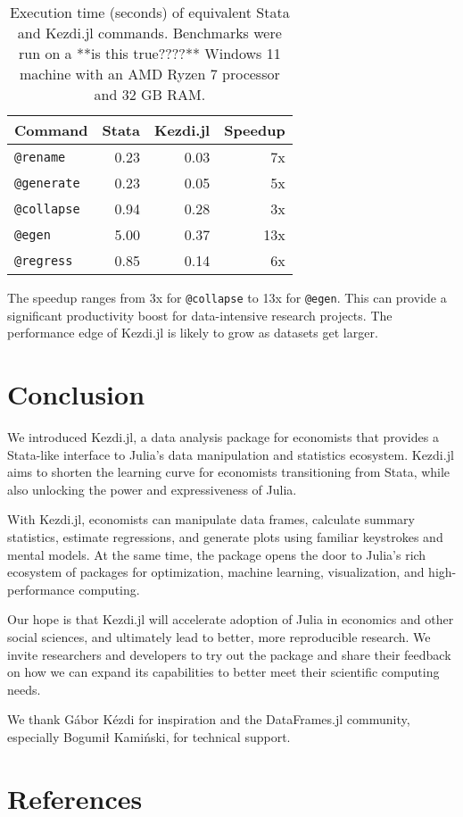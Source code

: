 \documentclass{juliacon}
\begin{document}
\begin{table}[ht]
	\centering
	\begin{tabular}{lrrr}
		\hline
		Command            & Stata & Kezdi.jl & Speedup \\
		\hline
		\texttt{@rename}   & 0.23  & 0.03     & 7x      \\
		\texttt{@generate} & 0.23  & 0.05     & 5x      \\
		\texttt{@collapse} & 0.94  & 0.28     & 3x      \\
		\texttt{@egen}     & 5.00  & 0.37     & 13x     \\
		\texttt{@regress}  & 0.85  & 0.14     & 6x      \\
		\hline
	\end{tabular}
	\caption{Execution time (seconds) of equivalent Stata and Kezdi.jl commands. Benchmarks were run on a **is this true????** Windows 11 machine with an AMD Ryzen 7 processor and 32 GB RAM.}
	\label{tab:benchmark}
\end{table}

The speedup ranges from 3x for \texttt{@collapse} to 13x for \texttt{@egen}. This can provide a significant productivity boost for data-intensive research projects. The performance edge of Kezdi.jl is likely to grow as datasets get larger.

\section{Conclusion}

We introduced Kezdi.jl, a data analysis package for economists that provides a Stata-like interface to Julia's data manipulation and statistics ecosystem. Kezdi.jl aims to shorten the learning curve for economists transitioning from Stata, while also unlocking the power and expressiveness of Julia.

With Kezdi.jl, economists can manipulate data frames, calculate summary statistics, estimate regressions, and generate plots using familiar keystrokes and mental models. At the same time, the package opens the door to Julia's rich ecosystem of packages for optimization, machine learning, visualization, and high-performance computing.

Our hope is that Kezdi.jl will accelerate adoption of Julia in economics and other social sciences, and ultimately lead to better, more reproducible research. We invite researchers and developers to try out the package and share their feedback on how we can expand its capabilities to better meet their scientific computing needs.

\backmatter


We thank Gábor Kézdi for inspiration and the DataFrames.jl community, especially Bogumił Kamiński, for technical support.

\section*{References}
\begingroup
\setlength{\parindent}{0pt}
\setlength{\parskip}{2pt}
\def\small{\small}




\endgroup
\end{document}
